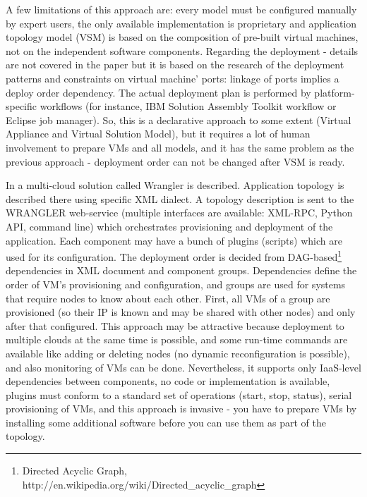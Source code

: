 \noindent A few limitations of this approach are: every model must be configured manually by expert users, the only available implementation is proprietary and application topology model (VSM) is based on the composition of pre-built virtual machines, not on the independent software components. Regarding the deployment - details are not covered in the paper but it is based on the research of the deployment patterns and constraints on virtual machine' ports: linkage of ports implies a deploy order dependency. The actual deployment plan is performed by platform-specific workflows (for instance, IBM Solution Assembly Toolkit workflow or Eclipse job manager). So, this is a declarative approach to some extent (Virtual Appliance and Virtual Solution Model), but it requires a lot of human involvement to prepare VMs and all models, and it has the same problem as the previous approach - deployment order can not be changed after VSM is ready. 

\noindent 

\noindent In \cite{juve2011automating} a multi-cloud solution called Wrangler is described. Application topology is described there using specific XML dialect. A topology description is sent to the WRANGLER web-service (multiple interfaces are available: XML-RPC, Python API, command line) which orchestrates provisioning and deployment of the application. Each component may have a bunch of plugins (scripts) which are used for its configuration. The deployment order is decided from DAG-based\footnote{ Directed Acyclic Graph, http://en.wikipedia.org/wiki/Directed\_acyclic\_graph} dependencies in XML document and component groups. Dependencies define the order of VM's provisioning and configuration, and groups are used for systems that require nodes to know about each other. First, all VMs of a group are provisioned (so their IP is known and may be shared with other nodes) and only after that configured. This approach may be attractive because deployment to multiple clouds at the same time is possible, and some run-time commands are available like adding or deleting nodes (no dynamic reconfiguration is possible), and also monitoring of VMs can be done. Nevertheless, it supports only IaaS-level dependencies between components, no code or implementation is available, plugins must conform to a standard set of operations (start, stop, status), serial provisioning of VMs, and this approach is invasive - you have to prepare VMs by installing some additional software before you can use them as part of the topology.

